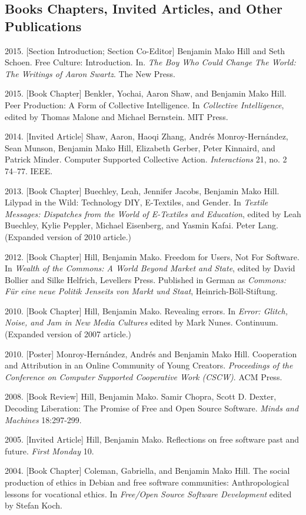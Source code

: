 \documentclass[10pt]{article}
\newenvironment{cvlist}{
\begin{list}{}{\leftmargin=3.0em \itemindent=-3.0em}
  \setlength{\itemsep}{0pt}
  \setlength{\parskip}{0em}
  \setlength{\parsep}{1em}
  \setlength{\parindent}{0em}}
{\vspace{1em}
\end{list}}
\begin{document}
\subsection{Books Chapters, Invited Articles, and Other Publications}
\begin{cvlist}
\item 2015. [Section Introduction; Section Co-Editor] Benjamin Mako Hill and Seth Schoen. Free Culture: Introduction. In. \emph{The Boy Who Could Change The World: The Writings of Aaron Swartz}. The New Press.
\item 2015. [Book Chapter] Benkler, Yochai, Aaron Shaw, and Benjamin Mako Hill. Peer Production: A Form of Collective Intelligence. In \emph{Collective Intelligence}, edited by Thomas Malone and Michael Bernstein. MIT Press.
\item 2014. [Invited Article] Shaw, Aaron, Haoqi Zhang, Andrés Monroy-Hernández, Sean Munson, Benjamin Mako Hill, Elizabeth Gerber, Peter Kinnaird, and Patrick Minder. Computer Supported Collective Action. \emph{Interactions} 21, no. 2 74–77. IEEE.
\item 2013. [Book Chapter] Buechley, Leah, Jennifer Jacobs, Benjamin Mako Hill. Lilypad in the Wild: Technology DIY, E-Textiles, and Gender. In \emph{Textile Messages: Dispatches from the World of E-Textiles and Education}, edited by Leah Buechley, Kylie Peppler, Michael Eisenberg, and Yasmin Kafai. Peter Lang. (Expanded version of 2010 article.)
\item 2012. [Book Chapter] Hill, Benjamin Mako. Freedom for Users, Not For Software. In \emph{Wealth of the Commons: A World Beyond Market and State}, edited by David Bollier and Silke Helfrich, Levellers Press. Published in German as \emph{Commons: Für eine neue Politik Jenseits von Markt und Staat}, Heinrich-Böll-Stiftung.
\item 2010. [Book Chapter] Hill, Benjamin Mako. Revealing errors. In \emph{Error: Glitch, Noise, and Jam in New Media Cultures} edited by Mark Nunes. Continuum. (Expanded version of 2007 article.)
\item 2010. [Poster] Monroy-Hernández, Andrés and Benjamin Mako Hill. Cooperation and Attribution in an Online Community of Young Creators. \emph{Proceedings of the Conference on Computer Supported Cooperative Work (CSCW)}. ACM Press.
\item 2008. [Book Review] Hill, Benjamin Mako. Samir Chopra, Scott D. Dexter, Decoding Liberation: The Promise of Free and Open Source Software. \emph{Minds and Machines} 18:297-299.
\item 2005. [Invited Article] Hill, Benjamin Mako. Reflections on free software past and future. \emph{First Monday} 10.
\item 2004. [Book Chapter] Coleman, Gabriella, and Benjamin Mako Hill. The social production of ethics in Debian and free software communities: Anthropological lessons for vocational ethics. In \emph{Free/Open Source Software Development} edited by Stefan Koch.
\end{cvlist}
\end{document}
